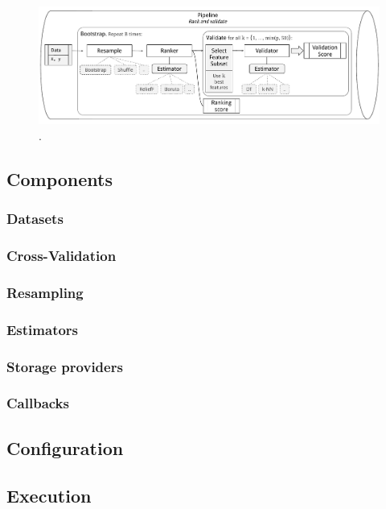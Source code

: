 \documentclass{article}
\begin{document}
\begin{figure}[h]
    \centering
    \includegraphics[width=\linewidth]{report/images/schematic-pipeline-architecture.pdf}
    \caption{.}
    \label{fig:schematic-pipeline-architecture}
\end{figure}

\subsection{Components}
\subsubsection{Datasets}\label{section:pipeline-components-datasets}

\subsubsection{Cross-Validation}
\subsubsection{Resampling}
\subsubsection{Estimators}
\subsubsection{Storage providers}
\subsubsection{Callbacks}

\subsection{Configuration}

\subsection{Execution}
\end{document}
